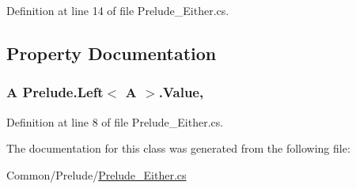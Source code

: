 Definition at line 14 of file Prelude\+\_\+\+Either.\+cs.



\subsection{Property Documentation}
\hypertarget{class_prelude_1_1_left_3_01_a_01_4_a4f4ab8bc34dd091e3f78ff8481a241fe}{
\subsubsection[{Value}]{\setlength{\rightskip}{0pt plus 5cm}A {\bf Prelude.\+Left}$<$ A $>$.Value\hspace{0.3cm}{\ttfamily [get]}, {\ttfamily [set]}}}\label{class_prelude_1_1_left_3_01_a_01_4_a4f4ab8bc34dd091e3f78ff8481a241fe}


Definition at line 8 of file Prelude\+\_\+\+Either.\+cs.



The documentation for this class was generated from the following file\+:\begin{DoxyCompactItemize}
\item 
Common/\+Prelude/\hyperlink{_prelude___either_8cs}{Prelude\+\_\+\+Either.\+cs}\end{DoxyCompactItemize}

